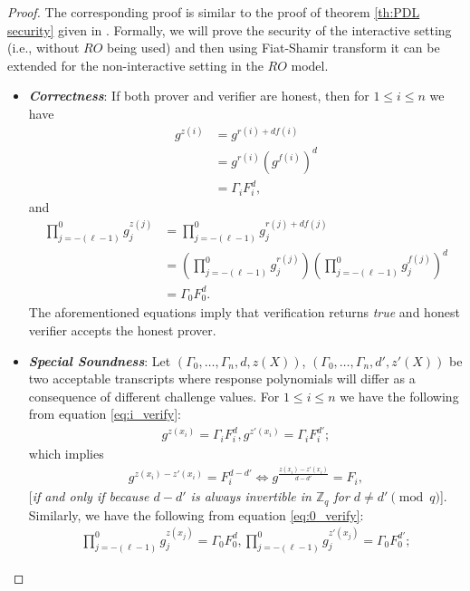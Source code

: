 \begin{proof}
  The corresponding proof is similar to the proof of theorem \ref{th:PDL security} given in \cite{cryptoeprint:2023/1669}. 
  Formally, we will prove the security of the interactive setting (i.e., without $RO$ being used) and then 
  using Fiat-Shamir transform it can be extended for the non-interactive setting in the $RO$ model. 

  \begin{itemize}
    \item \textit{\textbf{Correctness}}: If both prover and verifier are honest, then for $1\leq i\leq n$ 
      we have 
      \begin{align}\label{eq:i_verify}
        g^{z(i)}&=g^{r(i)+df(i)}\nonumber\\
        &=g^{r(i)}(g^{f(i)})^d\nonumber\\
        &=\Gamma_i F_i^d,
      \end{align}
      and 
      \begin{align}\label{eq:0_verify}
        \prod_{j=-(\ell-1)}^{0}g_j^{z(j)}&=\prod_{j=-(\ell-1)}^{0}g_j^{r(j)+df(j)}\nonumber\\
        &=(\prod_{j=-(\ell-1)}^{0}g_j^{r(j)})(\prod_{j=-(\ell-1)}^{0}g_j^{f(j)})^d\nonumber\\
        &=\Gamma_0 F_0^d.
      \end{align}
      The aforementioned equations imply that verification returns \textit{true} and honest verifier accepts the 
      honest prover.
    \item \textit{\textbf{Special Soundness}}: Let $(\Gamma_0,\dots,\Gamma_n,d,z(X))$, $(\Gamma_0,\dots,\Gamma_n,d',z'(X))$ 
      be two acceptable transcripts where response polynomials will differ as a consequence of different challenge 
      values. For $1\leq i\leq n$ we have the following from equation \ref{eq:i_verify}:
      \begin{align*}
        g^{z(x_i)}=\Gamma_i F_i^d,g^{z'(x_i)}=\Gamma_i F_i^{d'};
      \end{align*}
      which implies
      \begin{align}\label{eq:i_Equality}
        g^{z(x_i)-z'(x_i)}=F_i^{d-d'} \iff g^{\frac{z(x_i)-z'(x_i)}{d-d'}}=F_i,
      \end{align}
      [\textit{if and only if because $d-d'$ is always invertible in $\mathbb{Z}_q$ for $d\neq d'\pmod{q}$}]. Similarly, 
      we have the following from equation \ref{eq:0_verify}:
      \begin{align*}
        \prod_{j=-(\ell-1)}^{0}g_j^{z(x_j)}=\Gamma_0 F_0^d,\prod_{j=-(\ell-1)}^{0}g_j^{z'(x_j)}=\Gamma_0 F_0^{d'};

\end{align*}
\end{itemize}
\end{proof}
